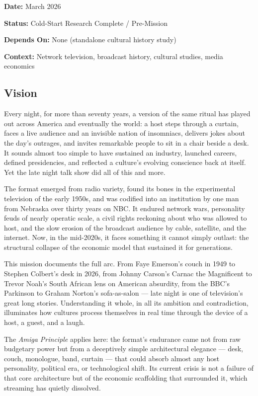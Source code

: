 \documentclass[11pt,letterpaper]{article}
\newcommand{\metafield}[2]{\textbf{\sffamily #1} #2\par}
\begin{document}
\metafield{Date:}{March 2026}
\metafield{Status:}{Cold-Start Research Complete / Pre-Mission}
\metafield{Depends On:}{None (standalone cultural history study)}
\metafield{Context:}{Network television, broadcast history, cultural studies, media economics}

\subsection{Vision}

Every night, for more than seventy years, a version of the same ritual has played out across America and eventually the world: a host steps through a curtain, faces a live audience and an invisible nation of insomniacs, delivers jokes about the day's outrages, and invites remarkable people to sit in a chair beside a desk. It sounds almost too simple to have sustained an industry, launched careers, defined presidencies, and reflected a culture's evolving conscience back at itself. Yet the late night talk show did all of this and more.

The format emerged from radio variety, found its bones in the experimental television of the early 1950s, and was codified into an institution by one man from Nebraska over thirty years on NBC. It endured network wars, personality feuds of nearly operatic scale, a civil rights reckoning about who was allowed to host, and the slow erosion of the broadcast audience by cable, satellite, and the internet. Now, in the mid-2020s, it faces something it cannot simply outlast: the structural collapse of the economic model that sustained it for generations.

This mission documents the full arc. From Faye Emerson's couch in 1949 to Stephen Colbert's desk in 2026, from Johnny Carson's Carnac the Magnificent to Trevor Noah's South African lens on American absurdity, from the BBC's Parkinson to Graham Norton's sofa-as-salon --- late night is one of television's great long stories. Understanding it whole, in all its ambition and contradiction, illuminates how cultures process themselves in real time through the device of a host, a guest, and a laugh.

The \textit{Amiga Principle} applies here: the format's endurance came not from raw budgetary power but from a deceptively simple architectural elegance --- desk, couch, monologue, band, curtain --- that could absorb almost any host personality, political era, or technological shift. Its current crisis is not a failure of that core architecture but of the economic scaffolding that surrounded it, which streaming has quietly dissolved.
\end{document}
